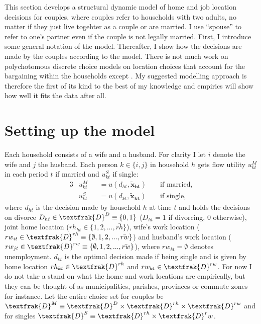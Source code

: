 This section develops a structural dynamic model of home and job location decisions for couples, where couples refer to households with two adults, no matter if they just live togehter as a couple or are married. I use ``spouse'' to refer to one's partner even if the couple is not legally married. First, I introduce some general notation of the model. Thereafter, I show how the decisions are made by the couples according to the model. There is not much work on polychotomous discrete choice models on location choices that account for the bargaining within the households except \cite{Gemici2011}. My suggested modelling approach is therefore the first of its kind to the best of my knowledge and empirics will show how well it fits the data after all.

\section{Setting up the model}\label{sec:setupmodel}
Each household consists of a wife and a husband. For clarity I let $i$ denote the wife and $j$ the husband. Each person $k\in\{i,j\}$ in household $h$ gets flow utility $u_{kt}^M$ in each period $t$ if married and $u_{kt}^S$ if single:
\begin{alignat*}{3}
&u_{kt}^M &&= u(d_{ht},\boldsymbol{\tilde{x}_{ht}}) &&\text{ if married}, \\
&u_{kt}^S &&= u(d_{kt},\boldsymbol{\tilde{x}_{kt}}) &&\text{ if single},
\end{alignat*}
where $d_{ht}$ is the decision made by household $h$ at time $t$ and holds the decisions on divorce $D_{ht}\in\textfrak{D}^D\equiv\{0,1\}$ ($D_{ht}=1$ if divorcing, 0 otherwise), joint home location ($rh_{ht}\in \{1,2,...,\bar{rh}\}$), wife's work location ($rw_{it}\in \textfrak{D}^{rh}\equiv \{\emptyset,1,2,...,\bar{rw}\}$) and husband's work location ($rw_{jt}\in \textfrak{D}^{rw}\equiv \{\emptyset,1,2,...,\bar{rw}\}$), where $rw_{kt}=\emptyset$ denotes unemployment. $d_{kt}$ is the optimal decision made if being single and is given by home location $rh_{kt}\in\textfrak{D}^{rh}$ and $rw_{kt}\in\textfrak{D}^{rw}$. For now I do not take a stand on what the home and work locations are empirically, but they can be thought of as municipalities, parishes, provinces or commute zones for instance. Let the entire choice set for couples be $\textfrak{D}^M\equiv \textfrak{D}^D\times\textfrak{D}^{rh}\times\textfrak{D}^{rw}$ and for singles $\textfrak{D}^S\equiv\textfrak{D}^{rh}\times\textfrak{D}^rw$.

